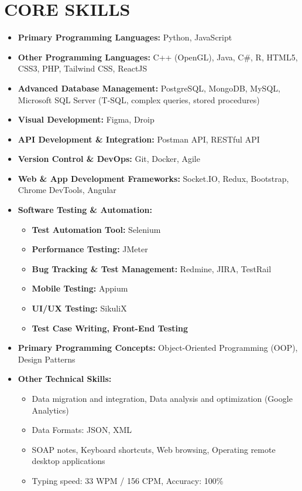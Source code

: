 \documentclass[a4paper,12pt]{article}
\begin{document}
\section*{CORE SKILLS}
\begin{itemize}[label=-]
    \item \textbf{Primary Programming Languages:} Python, JavaScript
    \item \textbf{Other Programming Languages:} C++ (OpenGL), Java, C\#, R, HTML5, CSS3, PHP, Tailwind CSS, ReactJS
    \item \textbf{Advanced Database Management:} PostgreSQL, MongoDB, MySQL, Microsoft SQL Server (T-SQL, complex queries, stored procedures)
    \item \textbf{Visual Development:} Figma, Droip
    \item \textbf{API Development \& Integration:} Postman API, RESTful API
    \item \textbf{Version Control \& DevOps:} Git, Docker, Agile
    \item \textbf{Web \& App Development Frameworks:} Socket.IO, Redux, Bootstrap, Chrome DevTools, Angular
    \item \textbf{Software Testing \& Automation:}  
    \begin{itemize}
        \item \textbf{Test Automation Tool:} Selenium
        \item \textbf{Performance Testing:} JMeter
        \item \textbf{Bug Tracking \& Test Management:} Redmine, JIRA, TestRail
        \item \textbf{Mobile Testing:} Appium
        \item \textbf{UI/UX Testing:} SikuliX
        \item \textbf{Test Case Writing, Front-End Testing}
    \end{itemize}
    \item \textbf{Primary Programming Concepts:} Object-Oriented Programming (OOP), Design Patterns
    \item \textbf{Other Technical Skills:}
    \begin{itemize}
        \item Data migration and integration, Data analysis and optimization (Google Analytics)
        \item Data Formats: JSON, XML
        \item SOAP notes, Keyboard shortcuts, Web browsing, Operating remote desktop applications
        \item Typing speed: 33 WPM / 156 CPM, Accuracy: 100\%
    \end{itemize}
\end{itemize}
\end{document}
